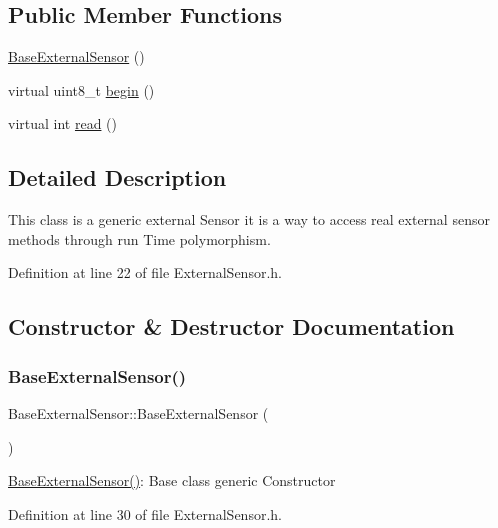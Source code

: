 \subsection*{Public Member Functions}
\begin{DoxyCompactItemize}
\item 
\hyperlink{classBaseExternalSensor_a978d96a6563b646efb358c2790a9fc6f}{Base\+External\+Sensor} ()
\item 
virtual uint8\+\_\+t \hyperlink{classBaseExternalSensor_a87d132803d4f4fdd4e66332809f0c9a0}{begin} ()
\item 
virtual int \hyperlink{classBaseExternalSensor_a7e0a98f350148d7645031315657aa5ec}{read} ()
\end{DoxyCompactItemize}


\subsection{Detailed Description}
This class is a generic external Sensor it is a way to access real external sensor methods through run Time polymorphism. 

Definition at line 22 of file External\+Sensor.\+h.



\subsection{Constructor \& Destructor Documentation}
\mbox{\label{classBaseExternalSensor_a978d96a6563b646efb358c2790a9fc6f}} 
\subsubsection{\texorpdfstring{Base\+External\+Sensor()}{BaseExternalSensor()}}
{\footnotesize\ttfamily Base\+External\+Sensor\+::\+Base\+External\+Sensor (\begin{DoxyParamCaption}{ }\end{DoxyParamCaption})\hspace{0.3cm}{\ttfamily [inline]}}

\hyperlink{classBaseExternalSensor_a978d96a6563b646efb358c2790a9fc6f}{Base\+External\+Sensor()}\+: Base class generic Constructor 

Definition at line 30 of file External\+Sensor.\+h.



